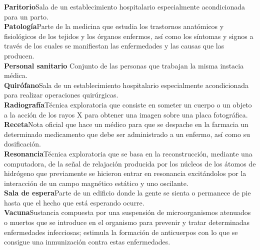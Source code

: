 \documentclass[12pt,a4paper]{article}
\newcommand{\term}[2]{\textbf{#1}\quad#2\\}
\begin{document}
	\term{Paritorio}{Sala de un establecimiento hospitalario especialmente acondicionada para un parto.}
	\term{Patología}{Parte de la medicina que estudia los trastornos anatómicos y fisiológicos de los tejidos y los órganos enfermos, así como los síntomas y signos a través de los cuales se manifiestan las enfermedades y las causas que las producen.}
	\term{Personal sanitario }{Conjunto de las personas que trabajan la misma instacia médica.}
	\term{Quirófano}{Sala de un establecimiento hospitalario especialmente acondicionada para realizar operaciones quirúrgicas.}
	\term{Radiografía}{Técnica exploratoria que consiste en someter un cuerpo o un objeto a la acción de los rayos X para obtener una imagen sobre una placa fotográfica.}
	\term{Receta}{Nota oficial que hace un médico para que se despache en la farmacia un determinado medicamento que debe ser administrado a un enfermo, así como su dosificación.}
	\term{Resonancia}{Técnica exploratoria que se basa en la reconstrucción, mediante una computadora, de la señal de relajación producida por los núcleos de los átomos de hidrógeno que previamente se hicieron entrar en resonancia excitándolos por la interacción de un campo magnético estático y uno oscilante.}
	\term{Sala de espera}{Parte de un edificio donde la gente se sienta o permanece de pie hasta que el hecho que está esperando ocurre.}
	\term{Vacuna}{Sustancia compuesta por una suspensión de microorganismos atenuados o muertos que se introduce en el organismo para prevenir y tratar determinadas enfermedades infecciosas; estimula la formación de anticuerpos con lo que se consigue una inmunización contra estas enfermedades.}


	
\end{document}
